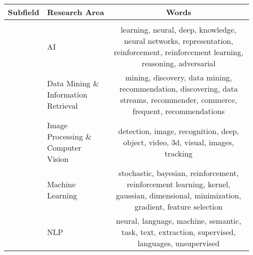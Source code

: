 \documentclass[reprint, twocolumn, aps, nofootinbib, superscriptaddress, longbibliography]{revtex4-1}
\begin{document}
\begin{table*}
\tiny
\begin{tabularx}{\textwidth}{llC}
\toprule
                        Subfield &                               Research Area &                                                                                                                                 Words \\
\midrule
\midrule
           &                                          &                                                                                                                                    \\
                              &                                          AI &     learning, neural, deep, knowledge, neural networks, representation, reinforcement, reinforcement learning, reasoning, adversarial \\
                              &         Data Mining \& Information Retrieval &           mining, discovery, data mining, recommendation, discovering, data streams, recommender, commerce, frequent, recommendations \\
                              &          Image Processing \& Computer Vision &                                                      detection, image, recognition, deep, object, video, 3d, visual, images, tracking \\
                              &                            Machine Learning & stochastic, bayesian, reinforcement, reinforcement learning, kernel, gaussian, dimensional, minimization, gradient, feature selection \\
                              &                                         NLP &                                      neural, language, machine, semantic, task, text, extraction, supervised, languages, unsupervised \\
                              \midrule


\end{tabularx}
\end{table*}
\end{document}

